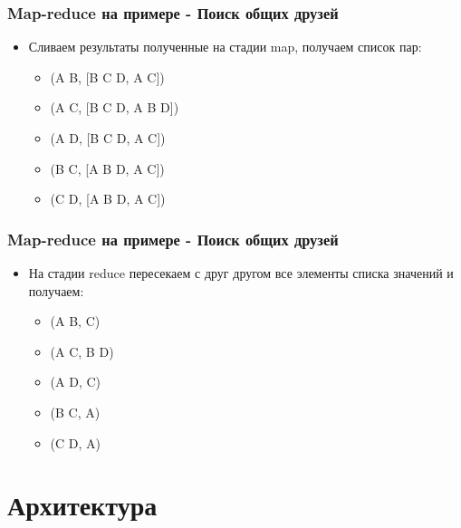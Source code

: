 \documentclass{beamer}
\begin{document}
    \begin{frame}
    \frametitle{Map-reduce на примере - Поиск общих друзей}
        \begin{itemize}
            \item Сливаем результаты полученные на стадии map, получаем список пар:
            \begin{itemize}
                \item (A B, [B C D, A C])
                \item (A C, [B C D, A B D])
                \item (A D, [B C D, A C])
                \item (B C, [A B D, A C])
                \item (C D, [A B D, A C])
            \end{itemize}
        \end{itemize}
    \end{frame} 

    \begin{frame}
    \frametitle{Map-reduce на примере - Поиск общих друзей}
        \begin{itemize}
            \item На стадии reduce пересекаем с друг другом все элементы списка значений и получаем:
            \begin{itemize}
                \item (A B, C)
                \item (A C, B D)
                \item (A D, C)
                \item (B C, A)
                \item (C D, A)
            \end{itemize}
        \end{itemize}
    \end{frame} 

\section{Архитектура}
\end{document}
